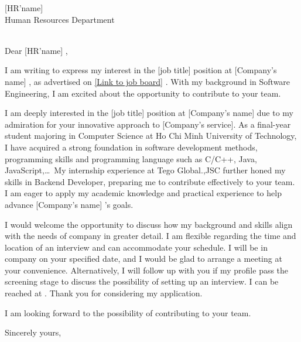 \documentclass[
	parskip=half, %
	enlargefirstpage=true, %
]{scrlttr2} %
\newcommand{\TONAME}{[HR'name] }
\newcommand{\TOPOSITION}{Human Resources Department }
\newcommand{\TOCOMPANY}{[Company's name] }
\newcommand{\TOLOCATION}{[Company's location] }
\newcommand{\COMPANYSERVICE}{[Company's service]}
\newcommand{\JOBTITLE}{[job title] }
\newcommand{\COMPANY}{[Company's name] }
\newcommand{\JOBBOARD}{\href{https://www.topcv.vn/viec-lam/internship-java-japanese-n4/1350923.html?ta_source=JobListInNormalCompany_LinkDetail}{[Link to job board]} }
\newcommand{\MYFIELD}{Software Engineering}
\begin{document}

\begin{letter}{
	\TONAME \\
	\TOPOSITION \\
	\TOCOMPANY \\
	\TOLOCATION
}

\opening{Dear \TONAME,}

I am writing to express my interest in the \JOBTITLE position at \COMPANY, as advertised on \JOBBOARD. With my background in \MYFIELD, I am excited about the opportunity to contribute to your team.

I am deeply interested in the \JOBTITLE position at \COMPANY due to my admiration for your innovative approach to \COMPANYSERVICE. As a final-year student majoring in Computer Science at Ho Chi Minh University of Technology, I have acquired a strong foundation in software development methods, programming skills and programming language such as C/C++, Java, JavaScript,\dots\ My internship experience at Tego Global.,JSC further honed my skills in Backend Developer, preparing me to contribute effectively to your team. I am eager to apply my academic knowledge and practical experience to help advance \COMPANY's goals.

I would welcome the opportunity to discuss how my background and skills align with the needs of company in greater detail. I am flexible regarding the time and location of an interview and can accommodate your schedule. I will be in company on your specified date, and I would be glad to arrange a meeting at your convenience. Alternatively, I will follow up with you if my profile pass the screening stage to discuss the possibility of setting up an interview. I can be reached at . Thank you for considering my application.

I am looking forward to the possibility of contributing to your team.

Sincerely yours, \\


\end{letter}
\end{document}

